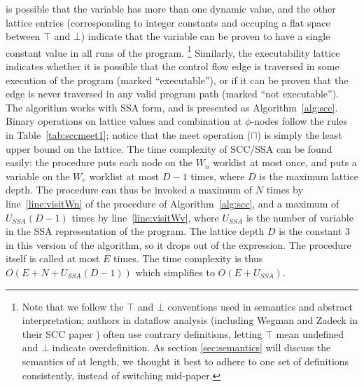 \documentclass[12pt,titlepage,twoside]{article}
\newcommand{\meet}{\ensuremath{\sqcap}}
\begin{document}
is possible that the variable has more than one dynamic value, and the
other lattice entries (corresponding to integer constants and occuping
a flat space between $\top$ and $\bot$) indicate that the variable can
be proven to have a single constant value in all runs of the program.%
\footnote{Note that we follow the $\top$ and $\bot$ conventions used
in semantics and abstract interpretation; authors in dataflow analysis
(including Wegman and Zadeck in their SCC paper \cite{wegman91:scc})
often use contrary definitions, letting $\top$ mean undefined and
$\bot$ indicate overdefinition.  As section \ref{sec:semantics} will
discuss the semantics of \ssiplus at length, we thought it best to
adhere to one set of definitions consistently, instead of switching
mid-paper.}
Similarly, the executability lattice indicates whether it is possible
that the control flow edge is traversed in some execution of the
program (marked ``executable''), or if it can be proven that the edge
is never traversed in any valid program path (marked ``not
executable'').  The algorithm works with SSA form, and is presented
as Algorithm~\ref{alg:scc}.  Binary operations on lattice values and
combination at $\phi$-nodes follow the rules in
Table~\ref{tab:sccmeet1}; notice that the meet operation ($\meet$) is
simply the least upper bound on the lattice.
The time complexity of SCC/SSA can be found
easily: the procedure  puts each node on the $W_n$
worklist at most once, and  puts a variable on the $W_v$
worklist at most $D-1$ times, where $D$ is the maximum lattice depth.
The  procedure can thus be invoked a maximum of $N$ times
by line~\ref{line:visitWn} of the  procedure of
Algorithm~\ref{alg:scc}, and a maximum of $U_{SSA}(D-1)$ times by
line~\ref{line:visitWv}, where $U_{SSA}$ is the number of variable
 in the SSA representation of the program.  The lattice
depth $D$ is the constant 3 in this version of the algorithm, so it
drops out of the expression.  The  procedure itself is
called at most $E$ times.  The time complexity is thus
$O(E+N+U_{SSA}(D-1))$ which simplifies to $O(E+U_{SSA})$.
\end{document}
